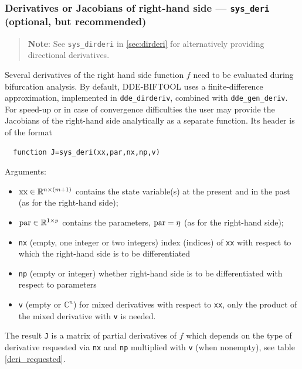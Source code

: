 \documentclass[10pt]{scrartcl}
\newcommand{\DDEBIFCODE}{\textsc{DDE-BIFTOOL}}
\newcommand{\file}[1]{\textbf{\texttt{#1}}}
\newcommand{\parm}[1]{\mathsf{#1}}
\newcommand{\RR}{\mathbb{R}}
\newcommand{\CC}{\mathbb{C}}
\newcommand{\blist}[1]{\mbox{\lstinline!#1!}}
\begin{document}
\subsubsection{Derivatives or Jacobians of right-hand side ---
  \texorpdfstring{\blist{sys_deri}}{sys\_deri} (optional, but
  recommended)}\label{sec:constjac}
\begin{quote}
  \textbf{Note}: See  \blist{sys_dirderi} in
  \cref{sec:dirderi} for alternatively providing directional derivatives.
\end{quote}
Several derivatives of the right hand side function $f$ need to be
evaluated during bifurcation analysis. By default, \DDEBIFCODE{} uses
a finite-difference approximation, implemented in
\blist{dde_dirderiv}, combined with \blist{dde_gen_deriv}. For
speed-up or in case of convergence difficulties the user may provide
the Jacobians of the right-hand side analytically as a separate
function. Its header is of the format
\begin{lstlisting}
  function J=sys_deri(xx,par,nx,np,v)
\end{lstlisting}
Arguments:
\begin{itemize}
\item $\blist{xx}\in\RR^{n\times (m+1)}$ contains the state
variable(s) at the present and in the past (as for the right-hand side);
\item $\blist{par}\in\RR^{1\times
  p}$ contains the parameters, $\blist{par}=\eta$  (as for the right-hand side);
\item \blist{nx} (empty, one integer or two integers) index (indices) of
  \blist{xx} with respect to which the right-hand side is to be
  differentiated
\item \blist{np} (empty or integer) whether right-hand side is to be
  differentiated with respect to parameters
\item \blist{v} (empty or $\CC^n$) for mixed derivatives with respect
  to \blist{xx}, only the product of the mixed derivative with
  \blist{v} is needed.
\end{itemize}
The result \blist{J} is a matrix of
partial derivatives of $f$ which depends on the type of derivative
requested via \blist{nx} and \blist{np} multiplied with \blist{v} (when
nonempty), see table \ref{deri_requested}.
\end{document}
